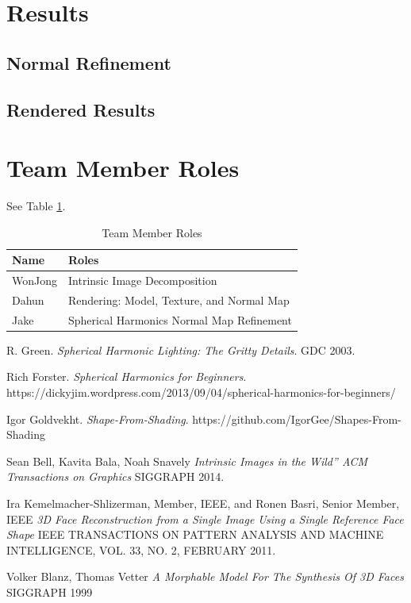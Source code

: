 \documentclass[10pt,twocolumn,letterpaper]{article}
\begin{document}
\section{Results}
\subsection{Normal Refinement}
\subsection{Rendered Results}


\section{Team Member Roles}
See Table \ref{tab:roles}.
\begin{table}[!h]
	\begin{tabular}{l|l}
		\textbf{Name} & Roles \\
		\hline
		WonJong & Intrinsic Image Decomposition \\
		Dahun & Rendering: Model, Texture, and Normal Map \\
		Jake & Spherical Harmonics Normal Map Refinement \\
		\hline
	\end{tabular}
	\caption{Team Member Roles}
	\label{tab:roles}
\end{table}

\begin{thebibliography}{1}
	R. Green.
	\textit{Spherical Harmonic Lighting: The Gritty Details}. 
	GDC 2003.
	
	Rich Forster.
	\textit{Spherical Harmonics for Beginners}. 
	https://dickyjim.wordpress.com/2013/09/04/spherical-harmonics-for-beginners/
	
	
	Igor Goldvekht. 
	\textit{Shape-From-Shading}. 
	https://github.com/IgorGee/Shapes-From-Shading
    
    
    Sean Bell, Kavita Bala, Noah Snavely
    \textit{Intrinsic Images in the Wild” ACM Transactions on Graphics}
    SIGGRAPH 2014.
    
    Ira Kemelmacher-Shlizerman, Member, IEEE, and Ronen Basri, Senior Member, IEEE \textit{3D Face Reconstruction from a Single Image Using a Single Reference Face Shape}
    IEEE TRANSACTIONS ON PATTERN ANALYSIS AND MACHINE INTELLIGENCE, VOL. 33, NO. 2, FEBRUARY 2011.
    
    Volker Blanz, Thomas Vetter
    \textit{A Morphable Model For The Synthesis Of 3D Faces}
    SIGGRAPH 1999
    
\end{thebibliography}
\end{document}
